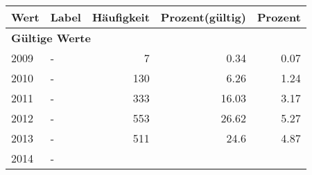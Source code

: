      \begin{longtable}{lXrrr}
     \toprule
     \textbf{Wert} & \textbf{Label} & \textbf{Häufigkeit} & \textbf{Prozent(gültig)} & \textbf{Prozent} \\
     \endhead
     \midrule
     \multicolumn{5}{l}{\textbf{Gültige Werte}}\\

     2009 &
     \multicolumn{1}{X}{ -  } &


       \num{7} &
       \num[round-mode=places,round-precision=2]{0.34} &
         \num[round-mode=places,round-precision=2]{0.07} \\

     2010 &
     \multicolumn{1}{X}{ -  } &


       \num{130} &
       \num[round-mode=places,round-precision=2]{6.26} &
         \num[round-mode=places,round-precision=2]{1.24} \\

     2011 &
     \multicolumn{1}{X}{ -  } &


       \num{333} &
       \num[round-mode=places,round-precision=2]{16.03} &
         \num[round-mode=places,round-precision=2]{3.17} \\

     2012 &
     \multicolumn{1}{X}{ -  } &


       \num{553} &
       \num[round-mode=places,round-precision=2]{26.62} &
         \num[round-mode=places,round-precision=2]{5.27} \\

     2013 &
     \multicolumn{1}{X}{ -  } &


       \num{511} &
       \num[round-mode=places,round-precision=2]{24.6} &
         \num[round-mode=places,round-precision=2]{4.87} \\

     2014 &
     \multicolumn{1}{X}{ -  } &



\end{longtable}
